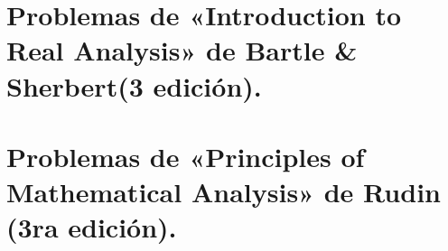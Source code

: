 


\section{Problemas de «Introduction to Real Analysis» de Bartle \& Sherbert(3 edición).} 



\section{Problemas de «Principles of Mathematical Analysis» de Rudin (3ra edición).}











